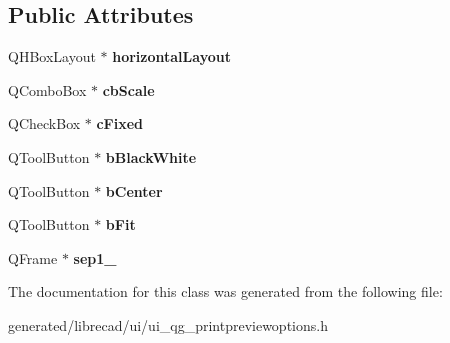 \subsection*{Public Attributes}
\begin{DoxyCompactItemize}
\item 
\hypertarget{classUi__QG__PrintPreviewOptions_aec538766b654d19ff2c745c66fa5293c}{Q\-H\-Box\-Layout $\ast$ {\bfseries horizontal\-Layout}}\label{classUi__QG__PrintPreviewOptions_aec538766b654d19ff2c745c66fa5293c}

\item 
\hypertarget{classUi__QG__PrintPreviewOptions_a503ffdd45319b73bd56b29d9a8efe703}{Q\-Combo\-Box $\ast$ {\bfseries cb\-Scale}}\label{classUi__QG__PrintPreviewOptions_a503ffdd45319b73bd56b29d9a8efe703}

\item 
\hypertarget{classUi__QG__PrintPreviewOptions_aa89e80f63fa40fc578ee9708fd7b5de3}{Q\-Check\-Box $\ast$ {\bfseries c\-Fixed}}\label{classUi__QG__PrintPreviewOptions_aa89e80f63fa40fc578ee9708fd7b5de3}

\item 
\hypertarget{classUi__QG__PrintPreviewOptions_a3e7f555f3adceef2e401e994d2a1d08a}{Q\-Tool\-Button $\ast$ {\bfseries b\-Black\-White}}\label{classUi__QG__PrintPreviewOptions_a3e7f555f3adceef2e401e994d2a1d08a}

\item 
\hypertarget{classUi__QG__PrintPreviewOptions_ae1ed4485c136e6129f1147f9ad61bfa0}{Q\-Tool\-Button $\ast$ {\bfseries b\-Center}}\label{classUi__QG__PrintPreviewOptions_ae1ed4485c136e6129f1147f9ad61bfa0}

\item 
\hypertarget{classUi__QG__PrintPreviewOptions_a10eed7546aef17e8c06624cdc22816a0}{Q\-Tool\-Button $\ast$ {\bfseries b\-Fit}}\label{classUi__QG__PrintPreviewOptions_a10eed7546aef17e8c06624cdc22816a0}

\item 
\hypertarget{classUi__QG__PrintPreviewOptions_a8ef974aab31605ed17e5a781ae6b14dd}{Q\-Frame $\ast$ {\bfseries sep1\-\_}}\label{classUi__QG__PrintPreviewOptions_a8ef974aab31605ed17e5a781ae6b14dd}

\end{DoxyCompactItemize}


The documentation for this class was generated from the following file\-:\begin{DoxyCompactItemize}
\item 
generated/librecad/ui/ui\-\_\-qg\-\_\-printpreviewoptions.\-h\end{DoxyCompactItemize}
